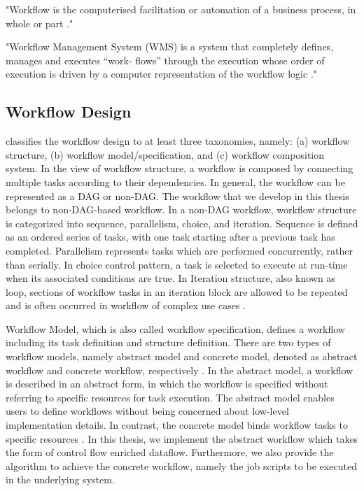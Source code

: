 \begin{definition}
"Workflow is the computerised facilitation or automation of a business process, in whole or part \cite{hollingsworth1993workflow}."
\label{def:workflow}
\end{definition}

\begin{definition}
"Workflow Management System (WMS) is a system that completely defines, manages and executes “work- flows” through the execution whose order of execution is driven by a computer representation of the workflow logic \cite{hollingsworth1993workflow}."
\label{def:wms}
\end{definition}

\subsection{Workflow Design}
\cite{yu2005taxonomy} classifies the workflow design to at least three taxonomies, namely: (a) workflow structure, (b) workflow model/specification, and (c) workflow composition system. In the view of workflow structure, a workflow is composed by connecting multiple tasks according to their dependencies. In general, the workflow can be represented as a DAG or non-DAG. The workflow that we develop in this thesis belongs to non-DAG-based workflow. In a non-DAG workflow, workflow structure is categorized into sequence, parallelism, choice, and iteration. Sequence is defined as an ordered series of tasks, with one task starting after a previous task has completed. Parallelism represents tasks which are performed concurrently, rather than serially. In choice control pattern, a task is selected to execute at run-time when its associated conditions are true. In Iteration structure, also known as loop, sections of workflow tasks in an iteration block are allowed to be repeated and is often occurred in workflow of complex use cases \cite{yu2005taxonomy}.  

Workflow Model, which is also called workflow specification, defines a workflow including its task definition and structure definition. There are two types of workflow models, namely abstract model and concrete model, denoted as abstract workflow and concrete workflow, respectively \cite{deelman2004workflow}. In the abstract model, a workflow is described in an abstract form, in which the workflow is specified without referring to specific resources for task execution. The abstract model enables users to define workflows without being concerned about low-level implementation details. In contrast, the concrete model binds workflow tasks to specific resources \cite{yu2005taxonomy}. In this thesis, we implement the abstract workflow which takes the form of control flow enriched dataflow. Furthermore, we also provide the algorithm to achieve the concrete workflow, namely the job scripts to be executed in the underlying system. 


